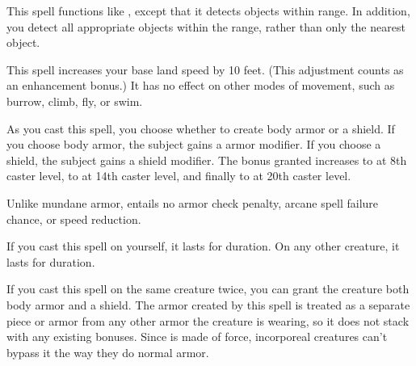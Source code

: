 \spellrng{\rngext}
\begin{spelleffect}
    This spell functions like , except that it detects objects within \rngext range. In addition, you detect all appropriate objects within the range, rather than only the nearest object. 
\end{spelleffect}

\spelldur{\durlong \dismissable}
\begin{spelleffect}
    This spell increases your base land speed by 10 feet. (This adjustment counts as an enhancement bonus.) It has no effect on other modes of movement, such as burrow, climb, fly, or swim.
\end{spelleffect}

\begin{comment}
\subsubsection{M}
\end{comment}

\begin{spelleffect}
    As you cast this spell, you choose whether to create body armor or a shield. If you choose body armor, the subject gains a  armor modifier. If you choose a shield, the subject gains a  shield modifier. The bonus granted increases to  at 8th caster level, to  at 14th caster level, and finally to  at 20th caster level. 
    \par Unlike mundane armor,  entails no armor check penalty, arcane spell failure chance, or speed reduction.
    \par If you cast this spell on yourself, it lasts for \durlong duration. On any other creature, it lasts for \durshort duration.
\end{spelleffect}
\begin{spellnotes}
    If you cast this spell on the same creature twice, you can grant the creature both body armor and a shield. The armor created by this spell is treated as a separate piece or armor from any other armor the creature is wearing, so it does not stack with any existing bonuses. Since  is made of force, incorporeal creatures can't bypass it the way they do normal armor.
\end{spellnotes}

